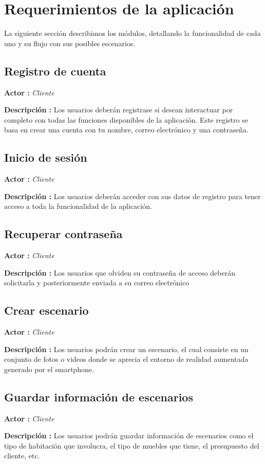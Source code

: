 \section{Requerimientos de la aplicación}
La siguiente sección describimos los módulos, detallando la funcionalidad de cada uno y su flujo con sus posibles escenarios.\par

\subsection{Registro de cuenta}
\textbf{Actor :} \textit{Cliente} \par
\textbf{Descripción :} Los usuarios deberán registrase si desean interactuar por completo con todas las funciones disponibles de la aplicación. Este registro se basa en crear una cuenta con tu nombre, correo electrónico y una contraseña.

\subsection{Inicio de sesión}
\textbf{Actor :} \textit{Cliente} \par
\textbf{Descripción :} Los usuarios deberán acceder con sus datos de registro para tener acceso a toda la funcionalidad de la aplicación.

\subsection{Recuperar contraseña}
\textbf{Actor :} \textit{Cliente} \par
\textbf{Descripción :} Los usuarios que olviden su contraseña de acceso deberán solicitarla y posteriormente enviada a su correo electrónico

\subsection{Crear escenario}
\textbf{Actor :} \textit{Cliente} \par
\textbf{Descripción :} Los usuarios podrán crear un escenario, el cual consiste en un conjunto de fotos o videos donde se aprecia el entorno de realidad aumentada generado por el smartphone.

\subsection{Guardar información de escenarios}
\textbf{Actor :} \textit{Cliente} \par
\textbf{Descripción :} Los usuarios podrán guardar información de escenarios como el tipo de habitación que involucra, el tipo de muebles que tiene, el presupuesto del cliente, etc.

